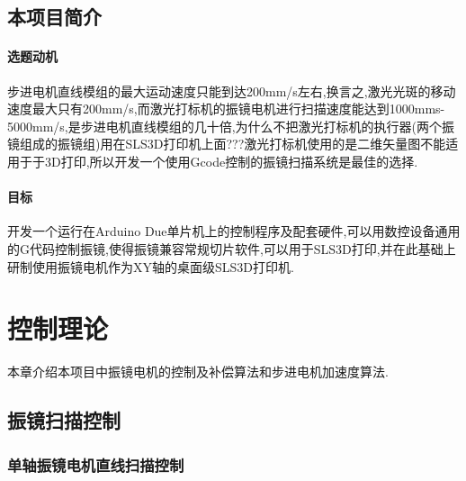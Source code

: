 \documentclass[a4paper,12pt,onecolumn,twoside]{article}
\begin{document}
\subsection{本项目简介}
\paragraph{选题动机}
步进电机直线模组的最大运动速度只能到达200mm/s左右,换言之,激光光斑的移动速度最大只有200mm/s,而激光打标机的振镜电机进行扫描速度能达到1000mms-5000mm/s,是步进电机直线模组的几十倍,为什么不把激光打标机的执行器(两个振镜组成的振镜组)用在SLS3D打印机上面???激光打标机使用的是二维矢量图不能适用于于3D打印,所以开发一个使用Gcode控制的振镜扫描系统是最佳的选择.
\paragraph{目标}
开发一个运行在Arduino Due单片机上的控制程序及配套硬件,可以用数控设备通用的G代码控制振镜,使得振镜兼容常规切片软件,可以用于SLS3D打印,并在此基础上研制使用振镜电机作为XY轴的桌面级SLS3D打印机.
\newpage

\section{控制理论}
本章介绍本项目中振镜电机的控制及补偿算法和步进电机加速度算法.
\subsection{振镜扫描控制}
\subsubsection{单轴振镜电机直线扫描控制}
\end{document}
